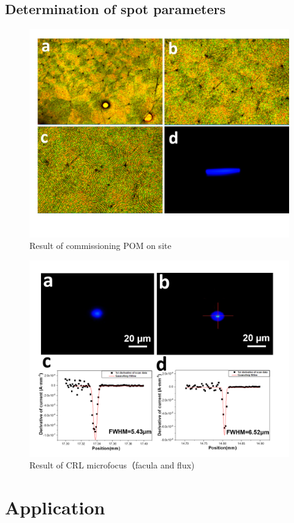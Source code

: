 \documentclass{Head}
\begin{document}
\subsection{Determination of spot parameters }
\begin{figure}
    \centering
    \includegraphics[scale=0.7]{Figures/Fig5CommissionPOMOnSite.png}
    \caption{Result of commissioning POM on site}
    \label{pictures}
\end{figure}
\begin{figure}
    \centering
    \includegraphics[scale=0.7]{Figures/Fig6CRLmicrofocus.png}
    \caption{Result of CRL microfocus（facula and flux)}
    \label{fitting}
\end{figure}
\section{Application}

\end{document}
